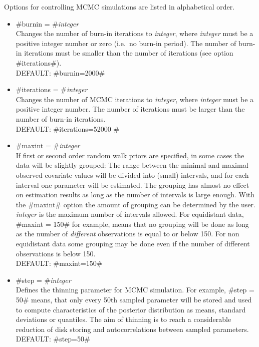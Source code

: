 Options for controlling MCMC simulations are listed in
alphabetical order.

\begin{itemize}
\item #burnin = #{\em integer } \\
Changes the number of burn-in iterations to {\em integer}, where
{\em integer} must be a positive integer number or zero (i.e.~no
burn-in period).
The number of burn-in iterations must be smaller than the number of iterations (see option #iterations#). \\
DEFAULT: #burnin=2000#

\item #iterations = #{\em integer } \\
Changes the number of MCMC iterations to {\em integer}, where {\em
integer} must be a positive integer number. The number of
iterations must be larger than the
number of burn-in iterations. \\
DEFAULT: #iterations=52000 #


\item #maxint = #{\em integer } \\
If first or second order random walk priors are specified, in some
cases the data will be slightly grouped: The range between the
minimal and maximal observed covariate values will be divided into
(small) intervals, and for each interval one parameter will be
estimated. The grouping has almost no effect on estimation results
as long as the number of intervals is large enough. With the
#maxint# option the amount of grouping can be determined by the
user. {\em integer} is the maximum number of intervals allowed.
For equidistant data, #maxint = 150# for example, means that no
grouping will be done as long as the number of {\em different}
observations is equal to or below 150. For non equidistant
data some grouping may be done even if the number of different observations is below 150. \\
DEFAULT: #maxint=150#

\item #step = #{\em integer} \\
Defines the thinning parameter for MCMC simulation. For example,
#step = 50# means, that only every 50th sampled parameter will be
stored and used to compute characteristics of the posterior
distribution as means, standard deviations or quantiles. The aim
of thinning is to reach a considerable reduction of disk storing
and autocorrelations between sampled parameters.\\
DEFAULT: #step=50#

\end{itemize}

